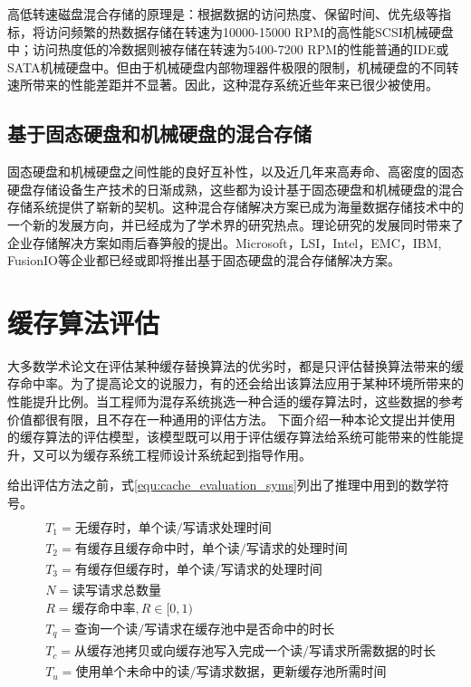 高低转速磁盘混合存储的原理是：根据数据的访问热度、保留时间、优先级等指标，将访问频繁的热数据存储在转速为10000-15000 RPM的高性能SCSI机械硬盘中；访问热度低的冷数据则被存储在转速为5400-7200 RPM的性能普通的IDE或SATA机械硬盘中。但由于机械硬盘内部物理器件极限的限制，机械硬盘的不同转速所带来的性能差距并不显著。因此，这种混存系统近些年来已很少被使用。

\subsection{基于固态硬盘和机械硬盘的混合存储}

固态硬盘和机械硬盘之间性能的良好互补性，以及近几年来高寿命、高密度的固态硬盘存储设备生产技术的日渐成熟，这些都为设计基于固态硬盘和机械硬盘的混合存储系统提供了崭新的契机。这种混合存储解决方案已成为海量数据存储技术中的一个新的发展方向，并已经成为了学术界的研究热点。理论研究的发展同时带来了企业存储解决方案如雨后春笋般的提出。Microsoft，LSI，Intel，EMC，IBM, FusionIO等企业都已经或即将推出基于固态硬盘的混合存储解决方案。

\section{缓存算法评估}
\label{sec:cache_evaluation}

大多数学术论文在评估某种缓存替换算法的优劣时，都是只评估替换算法带来的缓存命中率。为了提高论文的说服力，有的还会给出该算法应用于某种环境所带来的性能提升比例。当工程师为混存系统挑选一种合适的缓存算法时，这些数据的参考价值都很有限，且不存在一种通用的评估方法。
下面介绍一种本论文提出并使用的缓存算法的评估模型，该模型既可以用于评估缓存算法给系统可能带来的性能提升，又可以为缓存系统工程师设计系统起到指导作用。

给出评估方法之前，式\ref{equ:cache_evaluation_syms}列出了推理中用到的数学符号。
\begin{equation}
\begin{split}
\\&T_1=\mbox{无缓存时，单个读/写请求处理时间}
\\&T_2=\mbox{有缓存且缓存命中时，单个读/写请求的处理时间}
\\&T_3=\mbox{有缓存但缓存时，单个读/写请求的处理时间}
\\&N=\mbox{读写请求总数量}
\\&R=\mbox{缓存命中率},R\in\lbrack0,1)
\\&T_q=\mbox{查询一个读/写请求在缓存池中是否命中的时长}
\\&T_c=\mbox{从缓存池拷贝或向缓存池写入完成一个读/写请求所需数据的时长}
\\&T_u=\mbox{使用单个未命中的读/写请求数据，更新缓存池所需时间}
\end{split}
\label{equ:cache_evaluation_syms}
\end{equation}

